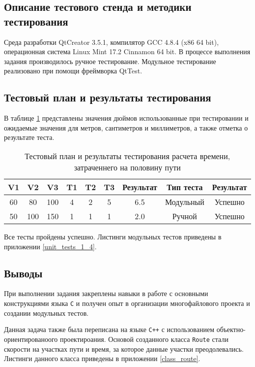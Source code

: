 \documentclass[12pt,a4paper]{report}
\begin{document}
\subsection{Описание тестового стенда и методики тестирования}
\hspace{\parindent}Среда разработки QtCreator 3.5.1, компилятор GCC 4.8.4 (x86 64 bit), операционная система Linux Mint 17.2 Cinnamon 64 bit.
В процессе выполнения задания производилось ручное тестирование.
Модульное тестирование реализовано при помощи фреймворка QtTest.

\subsection{Тестовый план и результаты тестирования}
\hspace{\parindent}В таблице \ref{time_test_plan} представлены значения дюймов использованные при тестировании и ожидаемые значения для метров, сантиметров и миллиметров, а также отметка о результате теста.
\FloatBarrier
\begin{table}[h]
\caption{Тестовый план и результаты тестирования расчета времени, затраченнего на половину пути}
\label{time_test_plan}
\begin{tabular}{| c c c | c c c | c | c | c |}
\hline 
V1 & V2 & V3 & T1 & T2 & T3 & Результат & Тип теста & Результат \\ 
\hline 
60 & 80 & 100 & 4 & 2 & 5 & 6.5 & Модульный & Успешно \\ 
\hline 
50 & 100 & 150 & 1 & 1 & 1 & 2.0 & Ручной & Успешно \\ 
\hline 
\end{tabular} 
\end{table}
\FloatBarrier
Все тесты пройдены успешно. Листинги модульных тестов приведены в приложении \ref{unit_tests_1_4}.
\subsection{Выводы}
\hspace{\parindent}При выполнении задания закреплены навыки в работе с основными конструкциями языка \verb+C+ и получен опыт в организации многофайлового проекта и создании модульных тестов.

Данная задача также была переписана на языке \verb|C++| с использованием объектно-ориентированоого проектироания. Основой созданного класса \verb+Route+ стали скорости на участках пути и время, за которое данные участки преодолевались. Листинги данного класса приведены в приложении \ref{class_route}.
\newpage
\end{document}
